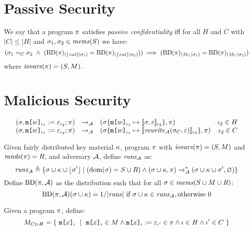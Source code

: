 \section{Passive Security}

\begin{definition}
  \label{definition-NIMO}
  We say that a program  $\pi$ satisfies \emph{passive confidentiality}
  iff for all $H$ and $C$ with $|C|\le|H|$ and 
  $\sigma_1,\sigma_2 \in \mathit{mems}(S)$ we have:
  $$
  (\store_1 =_C \store_2 \ \wedge \ 
  (\condd{\progtt(\prog)}{\{ \outv \}}{\store_1} = \condd{\progtt(\prog)}{\{ \outv \}}{\store_2}))
  \implies 
  (\condd{\progtt(\prog)}{M_C}{\store_1} = \condd{\progtt(\prog)}{M_C}{\store_2})
  $$
  where $\mathit{iovars}(\pi) = (S,M)$.
\end{definition}

\section{Malicious Security}

$$
\begin{array}{rclr}
  (\sigma, \texttt{m[}w\texttt{]}_{\iota_1} := \varepsilon_{\iota_2};\pi) &\xrightarrow{}_{\mathcal{A}}&
  (\sigma\{\texttt{m[}w\texttt{]}_{\iota_1} \mapsto \llbracket \sigma,\varepsilon \rrbracket_{\iota_2}\}, \pi) & \iota_2 \in H\\
  (\sigma, \texttt{m[}w\texttt{]}_{\iota_1} := \varepsilon_{\iota_2};\pi) &\xrightarrow{}_{\mathcal{A}}&
  (\sigma\{\texttt{m[}w\texttt{]}_{\iota_1} \mapsto \llbracket \mathit{rewrite}_{\mathcal{A}}(\sigma_C,\varepsilon) \rrbracket_{\iota_2}\}, \pi) & \iota_2 \in C
\end{array}
$$

\begin{definition}
  \label{def-progtt}
  \label{definition-progtt}
  Given fairly distributed key material $\kappa$, program $\pi$ with $\mathit{iovars}(\pi) = (S,M)$ and $\mathit{rands}(\pi) = R$,
  and adversary $\mathcal{A}$, define $\mathit{runs}_{\mathcal{A}}$ as:
  $$
  \mathit{runs}_{\mathcal{A}} \triangleq \{ \sigma \cup \kappa \cup \lfloor \sigma' \rfloor \mid (\mathrm{dom}(\sigma) = S \cup R) \wedge (\sigma \cup \kappa,\pi) \xrightarrow{}^{*}_{\mathcal{A}}
  (\sigma \cup \kappa \cup \sigma',\varnothing) \}
  $$
  Define $\mathrm{BD}(\pi, \mathcal{A})$ as the distribution such that for all
  $\sigma \in \mathit{mems}(S \cup M \cup R)$:
  $$
  \mathrm{BD}(\pi,\mathcal{A})(\sigma \cup \kappa) =  1 / |\mathit{runs}| \ \text{if}\ \sigma \cup \kappa \in \mathit{runs}_{\mathcal{A}}, \text{otherwise}\ 0
  $$
\end{definition}

\begin{definition}
  Given a program $\pi$, define:
  $$
  \cinputs = \{\ \elab{\mesg{x}}{\cid}\ \mid\  \elab{\mesg{x}}{\cid} \in M \wedge \eassign{\mesg{x}}{\cid}{\be}{\cid'} \in \prog
  \wedge \cid \in H \wedge \cid' \in C \ \} 
  $$
\end{definition}

